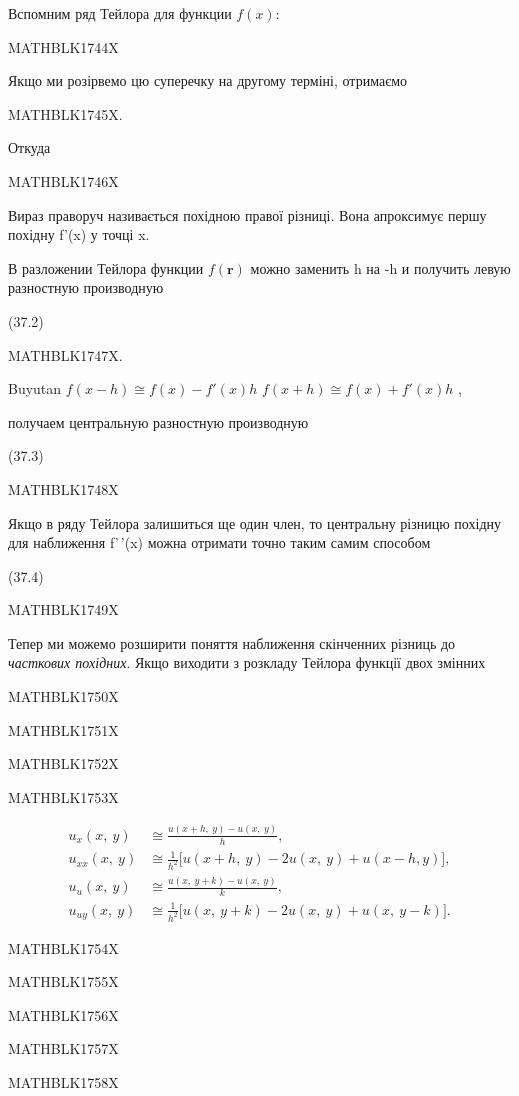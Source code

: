 \documentclass[
  ukrainian,
]{article}
\begin{document}
Вспомним ряд Тейлора для функции \(f(x)\):

MATHBLK1744X

Якщо ми розірвемо цю суперечку на другому терміні, отримаємо

MATHBLK1745X.

Откуда

MATHBLK1746X

Вираз праворуч називається похідною правої різниці. Вона апроксимує
першу похідну f'(x) у точці x.

В разложении Тейлора функции \(f(\mathbf{r})\) можно заменить h на -h и
получить левую разностную производную

(37.2)

MATHBLK1747X.

Buyutan \(f(x - h) \cong f(x) - f'(x) h\)
\nif \(f(x + h) \cong f( x) + f'(x) h\) ,

получаем центральную разностную производную

(37.3)

MATHBLK1748X

Якщо в ряду Тейлора залишиться ще один член, то центральну різницю
похідну для наближення f'\,'(x) можна отримати точно таким самим
способом

(37.4)

MATHBLK1749X

Тепер ми можемо розширити поняття наближення скінченних різниць до
\emph{часткових похідних}. Якщо виходити з розкладу Тейлора функції двох
змінних

MATHBLK1750X

MATHBLK1751X

MATHBLK1752X

MATHBLK1753X

\[
\begin{split} u_x(x,\ y) & \cong \frac{u(x+h,\ y)-u(x,\ y)}{h}, \\ u_{xx}(x,\ y) & \cong \frac{1}{h^2} \big[ u(x+h,\ y)-2u(x,\ y)+u(x-h,y) \big], \\ u_u(x,\ y) & \cong \frac{u(x,\ y+k)-u(x,\ y)}{k}, \\ u_{uy}(x,\ y) & \cong \frac{1}{h^2} \big[ u(x,\ y+k)-2u(x,\ y)+u(x,\ y-k) \big]. \end{split}
\]

MATHBLK1754X

MATHBLK1755X

MATHBLK1756X

MATHBLK1757X

MATHBLK1758X
\end{document}

